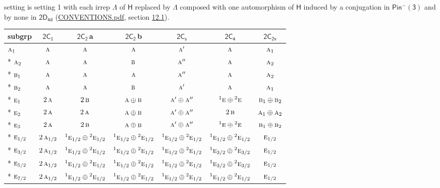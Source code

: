 \documentclass[10pt,a4paper]{article}
\numberwithin{equation}{section}
\newcommand{\grp}[1]{\mathsf{#1}}
\newcommand{\irr}[1]{\text{\normalfont\scshape #1}}
\newcommand{\conjpair}[1]{{}^{#1}}
\newcommand{\clsletter}[1]{\,{\scriptsize\color{black!55}#1}}
\begin{document}
setting is setting 1 with each irrep $\Lambda$ of $\grp{H}$ replaced by $\Lambda$ composed with one automorphism of $\grp{H}$ induced by a conjugation in \href{Pinminus3.pdf}{$\grp{Pin^{-}(3)}$} and by none in $\grp{2D_{4d}}$ (\href{../../CONVENTIONS.pdf}{CONVENTIONS.pdf}, section \href{../../../rotation/CONVENTIONS.pdf\#conv.12.1}{12.1}).
{\small\begin{longtable}{@{}lcccccc@{}}\toprule
subgrp & \href{2C1.pdf}{$\grp{2C_{1}}$} & \href{2C2.pdf}{$\grp{2C_{2}}$}\clsletter{a} & \href{2C2.pdf}{$\grp{2C_{2}}$}\clsletter{b} & \href{2C1v.pdf}{$\grp{2C_{s}}$} & \href{2C4.pdf}{$\grp{2C_{4}}$} & \href{2C2v.pdf}{$\grp{2C_{2v}}$}\\\midrule\endhead
\bottomrule\endfoot\endlastfoot
$\irr{a}_{1}$ & $\irr{a}$ & $\irr{a}$ & $\irr{a}$ & $\irr{a}'$ & $\irr{a}$ & $\irr{a}_{1}$\\*
$\irr{a}_{2}$ & $\irr{a}$ & $\irr{a}$ & $\irr{b}$ & $\irr{a}''$ & $\irr{a}$ & $\irr{a}_{2}$\\*
$\irr{b}_{1}$ & $\irr{a}$ & $\irr{a}$ & $\irr{a}$ & $\irr{a}''$ & $\irr{a}$ & $\irr{a}_{2}$\\*
$\irr{b}_{2}$ & $\irr{a}$ & $\irr{a}$ & $\irr{b}$ & $\irr{a}'$ & $\irr{a}$ & $\irr{a}_{1}$\\*
$\irr{e}_{1}$ & $2\,\irr{a}$ & $2\,\irr{b}$ & $\irr{a}\oplus \irr{b}$ & $\irr{a}'\oplus \irr{a}''$ & $\conjpair{1}\irr{e}\oplus \conjpair{2}\irr{e}$ & $\irr{b}_{1}\oplus \irr{b}_{2}$\\*
$\irr{e}_{2}$ & $2\,\irr{a}$ & $2\,\irr{a}$ & $\irr{a}\oplus \irr{b}$ & $\irr{a}'\oplus \irr{a}''$ & $2\,\irr{b}$ & $\irr{a}_{1}\oplus \irr{a}_{2}$\\*
$\irr{e}_{3}$ & $2\,\irr{a}$ & $2\,\irr{b}$ & $\irr{a}\oplus \irr{b}$ & $\irr{a}'\oplus \irr{a}''$ & $\conjpair{1}\irr{e}\oplus \conjpair{2}\irr{e}$ & $\irr{b}_{1}\oplus \irr{b}_{2}$\\*
$\irr{e}_{1/2}$ & $2\,\irr{a}_{1/2}$ & $\conjpair{1}\irr{e}_{1/2}\oplus \conjpair{2}\irr{e}_{1/2}$ & $\conjpair{1}\irr{e}_{1/2}\oplus \conjpair{2}\irr{e}_{1/2}$ & $\conjpair{1}\irr{e}_{1/2}\oplus \conjpair{2}\irr{e}_{1/2}$ & $\conjpair{1}\irr{e}_{1/2}\oplus \conjpair{2}\irr{e}_{1/2}$ & $\irr{e}_{1/2}$\\*
$\irr{e}_{3/2}$ & $2\,\irr{a}_{1/2}$ & $\conjpair{1}\irr{e}_{1/2}\oplus \conjpair{2}\irr{e}_{1/2}$ & $\conjpair{1}\irr{e}_{1/2}\oplus \conjpair{2}\irr{e}_{1/2}$ & $\conjpair{1}\irr{e}_{1/2}\oplus \conjpair{2}\irr{e}_{1/2}$ & $\conjpair{1}\irr{e}_{3/2}\oplus \conjpair{2}\irr{e}_{3/2}$ & $\irr{e}_{1/2}$\\*
$\irr{e}_{5/2}$ & $2\,\irr{a}_{1/2}$ & $\conjpair{1}\irr{e}_{1/2}\oplus \conjpair{2}\irr{e}_{1/2}$ & $\conjpair{1}\irr{e}_{1/2}\oplus \conjpair{2}\irr{e}_{1/2}$ & $\conjpair{1}\irr{e}_{1/2}\oplus \conjpair{2}\irr{e}_{1/2}$ & $\conjpair{1}\irr{e}_{3/2}\oplus \conjpair{2}\irr{e}_{3/2}$ & $\irr{e}_{1/2}$\\*
$\irr{e}_{7/2}$ & $2\,\irr{a}_{1/2}$ & $\conjpair{1}\irr{e}_{1/2}\oplus \conjpair{2}\irr{e}_{1/2}$ & $\conjpair{1}\irr{e}_{1/2}\oplus \conjpair{2}\irr{e}_{1/2}$ & $\conjpair{1}\irr{e}_{1/2}\oplus \conjpair{2}\irr{e}_{1/2}$ & $\conjpair{1}\irr{e}_{1/2}\oplus \conjpair{2}\irr{e}_{1/2}$ & $\irr{e}_{1/2}$\\
\bottomrule\end{longtable}}
\end{document}
